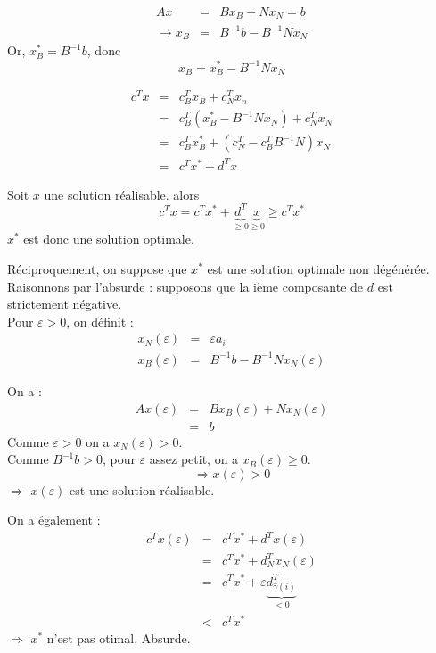 \begin{dem}
\begin{eqnarray*}
	Ax&=&Bx_B+Nx_N=b\\
\rightarrow x_B&=&B^{-1}b-B^{-1}Nx_N
\end{eqnarray*}
Or, $x^*_B=B^{-1}b$, donc \[x_B=x^*_B-B^{-1}Nx_N\]

\begin{eqnarray*}
	c^Tx&=&c_B^Tx_B+c^T_Nx_n\\
	&=&c^T_B(x^*_B-B^{-1}Nx_N)+c^T_N x_N\\
	&=&c^T_Bx_B^*+(c^T_N-c^T_BB^{-1}N)x_N\\
	&=&c^Tx^*+d^Tx
\end{eqnarray*}
\end{dem}



\begin{dem}
Soit $x$ une solution réalisable. alors 
\[c^Tx=c^Tx^*+\underbrace{d^T}_{\geq 0}\underbrace{x}_{\geq 0}\geq c^Tx^*\]
$x^*$ est donc une solution optimale.

\bigskip
Réciproquement, on suppose que $x^*$ est une solution optimale non dégénérée.\\
Raisonnons par l'absurde : supposons que la ième composante de $d$ est strictement négative.\\
Pour $\varepsilon>0$, on définit :
\begin{eqnarray*}
	x_N(\varepsilon)&=&\varepsilon a_i\\
	x_B(\varepsilon)&=&B^{-1}b-B^{-1}Nx_N(\varepsilon)
\end{eqnarray*}

On a :
\begin{eqnarray*}
	Ax(\varepsilon)&=&Bx_B(\varepsilon)+Nx_N(\varepsilon)\\
			&=&b
\end{eqnarray*}
Comme $\varepsilon>0$ on a $x_N(\varepsilon)>0$.\\
Comme $B^{-1}b>0$, pour $\varepsilon$ assez petit, on a $x_B(\varepsilon)\geq 0$.\\
\[\Rightarrow x(\varepsilon)>0\]
$\Rightarrow$ $x(\varepsilon)$ est une solution réalisable.

\bigskip
On a également :
\begin{eqnarray*}
	c^Tx(\varepsilon)&=&c^Tx^*+d^Tx(\varepsilon)\\
		&=&c^Tx^*+d^T_Nx_N(\varepsilon)\\
		&=&c^Tx^*+\varepsilon \underbrace{d^T_{\hat{\gamma}(i)}}_{<0}\\
		&<&c^Tx^*
\end{eqnarray*}
$\Rightarrow$ $x^*$ n'est pas otimal. Absurde.
\end{dem}

